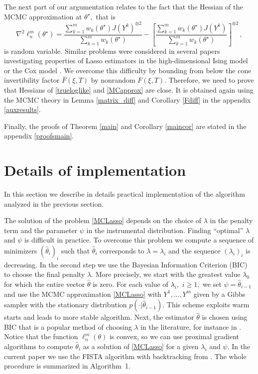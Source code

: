 \documentclass[twoside,11pt]{article}
\def\llnm{\ell_n^m}
\def\th{\theta}
\def\ths{\th^\star}
\def\hth{\hat{\theta}}
\def\hess{\nabla^2}
\def\ef{F(\xi,T)}
\def\bef{\bar{F}(\xi,T)}
\begin{document}
The next part of our argumentation relates to the fact that the Hessian of the MCMC approximation at $\ths,$ that is 
\begin{equation}
\label{2deriv}
\hess \llnm(\ths) = 
\frac{\sum\limits_{k=1}^{m} w_k(\ths) J(Y^k)^{\otimes 2}}
                 {\sum\limits_{k=1}^{m} w_k(\ths)} - 
\left[\frac{\sum\limits_{k=1}^{m} w_k(\ths) J(Y^k)}
                 {\sum\limits_{k=1}^{m} w_k(\ths) } \right]^{\otimes 2}\, ,
\end{equation} 
is random variable. Similar problems were considered in several papers investigating properties of Lasso estimators in the high-dimensional Ising model \citep{Ravi10, Guoetal10, Xueetal12} or the Cox model \citep{Cox13}. We overcome this difficulty by bounding from below the cone invertibility factor $\bef$ by nonrandom $\ef .$ Therefore, we need to prove that 
Hessians of  
\eqref{trueloglike} and \eqref{MCapprox} are close. It is obtained again using the MCMC theory in Lemma \ref{matrix_diff} and Corollary \ref{Fdiff} in the appendix 
\ref{auxresults}.
 
Finally, the proofs of Theorem \ref{main} and Corollary \ref{maincor} are stated in the appendix \ref{proofsmain}.


\section{Details of implementation}\label{implementation}
In this section we describe in details practical implementation of the algorithm analyzed in the previous section. 



The solution of the problem \eqref{MCLasso} depends on the choice of $\lambda$ in the penalty term and the parameter $\psi$ in the instrumental distribution. 
Finding ``optimal'' $\lambda$ and $\psi$ is difficult in practice. 
To overcome this problem  we compute a sequence of minimizers  $(\hat\theta_i)_i$ such that 
$\hth _i$ corresponds to $\lambda = \lambda_i$ and the sequence $(\lambda_i)_i$ is decreasing. In the second step we use the Bayesian Information Criterion (BIC) to choose 
the final penalty $\lambda$. More precisely, we start with the greatest value $\lambda_0$ for which the entire vector $\hat\theta$ is zero. 
For each value of $\lambda_i,$ $i \geq 1,$ we set $\psi=\hat\theta_{i-1}$ 
and use the MCMC approximation \eqref{MCLasso} with $Y^1,\dots,Y^m$ given by a Gibbs sampler with the stationary distribution $p(\cdot | \hth _{i-1})$.
This scheme exploits warm starts and leads to  more stable algorithm. 
Next, the estimator $\hth$ is chosen using  BIC that is a popular method of choosing $\lambda$ in the literature, for instance in \citet{Xueetal12}. 
Notice that the function $\ell^m_n(\th)$ is  convex, so we can use proximal gradient algorithms to compute $\hat\theta_i$ as a solution of
\eqref{MCLasso} for a given $\lambda_i$ and $\psi$.  In the current paper we use the FISTA algorithm with backtracking from \citet{FISTA}. The whole procedure is summarized in Algorithm~1.
\end{document}

